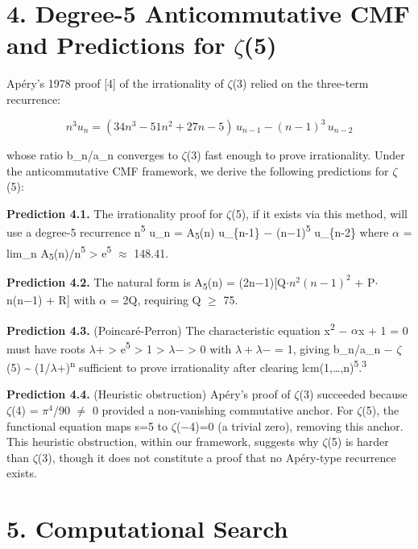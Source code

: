 \documentclass[11pt]{article}
\begin{document}
\hypertarget{degree-5-anticommutative-cmf-and-predictions-for-5}{%
\section{\texorpdfstring{4. Degree-5 Anticommutative CMF and Predictions
for
\(\zeta\)(5)}{4. Degree-5 Anticommutative CMF and Predictions for (5)}}\label{degree-5-anticommutative-cmf-and-predictions-for-5}}

Apéry's 1978 proof {[}4{]} of the irrationality of \(\zeta\)(3) relied
on the three-term recurrence:

\[n^3 u_n = (34n^3 - 51n^2 + 27n - 5)\, u_{n-1} - (n-1)^3\, u_{n-2}\]

whose ratio b\_n/a\_n converges to \(\zeta\)(3) fast enough to prove
irrationality. Under the anticommutative CMF framework, we derive the
following predictions for \(\zeta\)(5):

\textbf{Prediction 4.1.} The irrationality proof for \(\zeta\)(5), if it
exists via this method, will use a degree-5 recurrence
n\textsuperscript{5} u\_n = A\textsubscript{5}(n) u\_\{n-1\} −
(n−1)\textsuperscript{5} u\_\{n-2\} where \(\alpha\) = lim\_n
A\textsubscript{5}(n)/n\textsuperscript{5} \textgreater{}
e\textsuperscript{5} \(\approx\) 148.41.

\textbf{Prediction 4.2.} The natural form is A\textsubscript{5}(n) =
(2n−1){[}Q\(\cdot n^{2}(n−1)^{2}\) + P\(\cdot\)n(n−1) + R{]} with
\(\alpha\) = 2Q, requiring Q \(\geq\) 75.

\textbf{Prediction 4.3.} (Poincaré-Perron) The characteristic equation
x\textsuperscript{2} − \(\alpha\)x + 1 = 0 must have roots \(\lambda\)+
\textgreater{} e\textsuperscript{5} \textgreater{} 1 \textgreater{}
\(\lambda\)− \textgreater{} 0 with \(\lambda+\lambda\)− = 1, giving
\textbar b\_n/a\_n − \(\zeta\)(5)\textbar{} \textasciitilde{}
(1/\(\lambda\)+)\textsuperscript{n} sufficient to prove irrationality
after clearing lcm(1,\ldots,n)\textsuperscript{5}.\textsuperscript{3}

\textbf{Prediction 4.4.} (Heuristic obstruction) Apéry's proof of
\(\zeta\)(3) succeeded because \(\zeta\)(4) = \(\pi^{4}\)/90 \(\neq\) 0
provided a non-vanishing commutative anchor. For \(\zeta\)(5), the
functional equation maps s=5 to \(\zeta\)(−4)=0 (a trivial zero),
removing this anchor. This heuristic obstruction, within our framework,
suggests why \(\zeta\)(5) is harder than \(\zeta\)(3), though it does
not constitute a proof that no Apéry-type recurrence exists.

\hypertarget{computational-search}{%
\section{5. Computational Search}\label{computational-search}}
\end{document}
